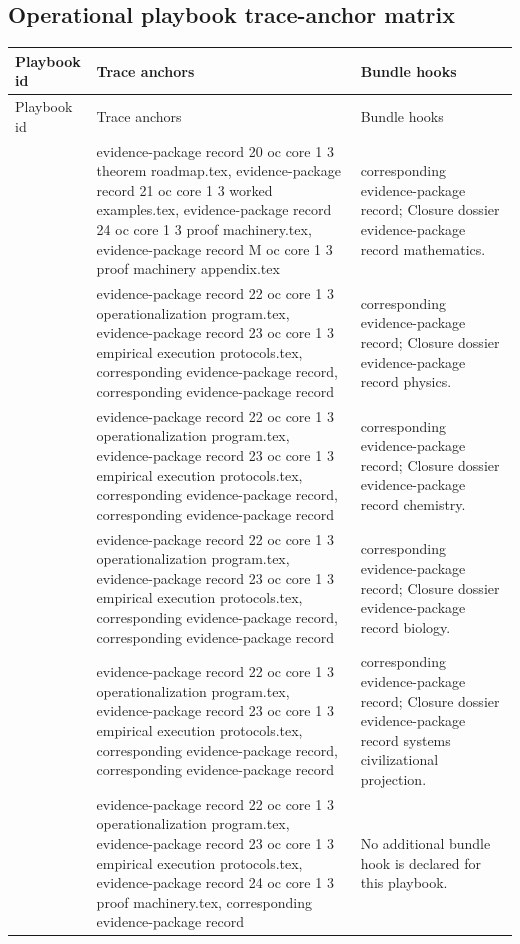 \subsection{Operational playbook trace-anchor matrix}
\begin{longtable}{@{}L{0.16\textwidth}L{0.38\textwidth}L{0.34\textwidth}@{}}
\toprule
Playbook id & Trace anchors & Bundle hooks \\
\midrule
\endfirsthead
\toprule
Playbook id & Trace anchors & Bundle hooks \\
\midrule
\endhead
{} & evidence-package record 20 oc core 1 3 theorem roadmap.tex, \allowbreak evidence-package record 21 oc core 1 3 worked examples.tex, \allowbreak evidence-package record 24 oc core 1 3 proof machinery.tex, \allowbreak evidence-package record M oc core 1 3 proof machinery appendix.tex & corresponding evidence-package record; Closure dossier evidence-package record mathematics. \\
 & evidence-package record 22 oc core 1 3 operationalization program.tex, \allowbreak evidence-package record 23 oc core 1 3 empirical execution protocols.tex, corresponding evidence-package record, corresponding evidence-package record & corresponding evidence-package record; Closure dossier evidence-package record physics. \\
 & evidence-package record 22 oc core 1 3 operationalization program.tex, \allowbreak evidence-package record 23 oc core 1 3 empirical execution protocols.tex, corresponding evidence-package record, corresponding evidence-package record & corresponding evidence-package record; Closure dossier evidence-package record chemistry. \\
 & evidence-package record 22 oc core 1 3 operationalization program.tex, \allowbreak evidence-package record 23 oc core 1 3 empirical execution protocols.tex, corresponding evidence-package record, corresponding evidence-package record & corresponding evidence-package record; Closure dossier evidence-package record biology. \\
 & evidence-package record 22 oc core 1 3 operationalization program.tex, \allowbreak evidence-package record 23 oc core 1 3 empirical execution protocols.tex, corresponding evidence-package record, corresponding evidence-package record & corresponding evidence-package record; Closure dossier evidence-package record systems civilizational projection. \\
 & evidence-package record 22 oc core 1 3 operationalization program.tex, \allowbreak evidence-package record 23 oc core 1 3 empirical execution protocols.tex, \allowbreak evidence-package record 24 oc core 1 3 proof machinery.tex, corresponding evidence-package record & No additional bundle hook is declared for this playbook. \\
\bottomrule
\end{longtable}

